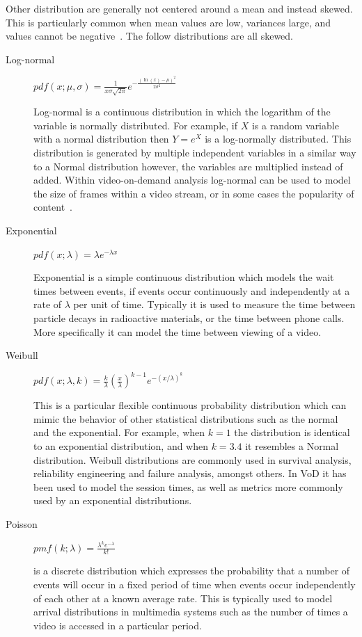 Other distribution are generally not centered around a mean and instead skewed. This is particularly common when mean values are low, variances large, and values cannot be negative~\cite{limpert2001lnd}. The follow distributions are all skewed.

\begin{description}
  \item[Log-normal] {\Large $pdf(x;\mu,\sigma) = \frac{1}{x \sigma \sqrt{2 \pi}}e^{-\frac{(\ln (x) - \mu)^2}{2\sigma^2}}$}

  Log-normal is a continuous distribution in which the logarithm of the variable is normally distributed. For example, if $X$ is a random variable with a normal distribution then $Y=e^X$ is a log-normally distributed. This distribution is generated by multiple independent variables in a similar way to a Normal distribution however, the variables are multiplied instead of added. Within video-on-demand analysis log-normal can be used to model the size of frames within a video stream, or in some cases the popularity of content~\cite{cha2007tyt}.


  \item[Exponential] {\Large $pdf(x;\lambda) = \lambda e^{-\lambda x}$}

  Exponential is a simple continuous distribution which models the wait times between events, if events occur continuously and independently at a rate of $\lambda$ per unit of time. Typically it is used to measure the time between particle decays in radioactive materials, or the time between phone calls. More specifically it can model the time between viewing of a video.

  \item[Weibull] {\Large $pdf(x;\lambda,k) = \frac{k}{\lambda}\left(\frac{x}{\lambda}\right)^{k-1}e^{-(x/\lambda)^{k}}$}

  This is a particular flexible continuous probability distribution which can mimic the behavior of other statistical distributions such as the normal and the exponential. For example, when $k=1$ the distribution is identical to an exponential distribution, and when $k=3.4$ it resembles a Normal distribution. Weibull distributions are commonly used in survival analysis, reliability engineering and failure analysis, amongst others. In VoD it has been used to model the session times, as well as metrics more commonly used by an exponential distributions.

  \item[Poisson] {\Large $pmf(k; \lambda) = \frac{\lambda^k e^{-\lambda}}{k!}$}

  is a discrete distribution which expresses the probability that a number of events will occur in a fixed period of time when events occur independently of each other at a known average rate. This is typically used to model arrival distributions in multimedia systems such as the number of times a video is accessed in a particular period.

\end{description}

